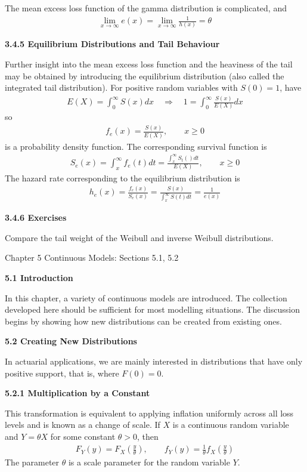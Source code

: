 \documentclass[hidelinks, 12pt]{article}
\theoremstyle{mydefstyle}
\theoremstyle{mythmstyle}
\begin{document}
The mean excess loss function of the gamma distribution is complicated, and
\begin{gather*}
\lim_{x \to \infty} e(x) = \lim_{x \to \infty} \frac{1}{h(x)} = \theta
\end{gather*}

\textbf{3.4.5 Equilibrium Distributions and Tail Behaviour}

Further insight into the mean excess loss function and the heaviness of the tail may be obtained by introducing the equilibrium distribution (also called the integrated tail distribution). For positive random variables with $S(0) = 1$, have
\begin{gather*}
E(X) = \int_0^{\infty} S(x) dx \quad\Rightarrow\quad 1 = \int_0^{\infty} \frac{S(x)}{E(X)} dx
\end{gather*}
so 
\begin{gather*}
f_e(x) = \frac{S(x)}{E(X)}, \qquad x \ge 0
\end{gather*}
is a probability density function. The corresponding survival function is
\begin{gather*}
S_e(x) = \int_x^{\infty} f_e(t) dt = \frac{\int_x^{\infty} S_t() dt}{E(X)}, \qquad x \ge 0
\end{gather*}
The hazard rate corresponding to the equilibrium distribution is
\begin{gather*}
h_e(x) = \frac{f_e(x)}{S_e(x)} = \frac{S(x)}{\int_x^{\infty} S(t) dt} = \frac{1}{e(x)}
\end{gather*}

\textbf{3.4.6 Exercises}

Compare the tail weight of the Weibull and inverse Weibull distributions.

\newpage

Chapter 5 Continuous Models: Sections 5.1, 5.2

\textbf{5.1 Introduction}

In this chapter, a variety of continuous models are introduced. The collection developed here should be sufficient for most modelling situations. The discussion begins by showing how new distributions can be created from existing ones.

\textbf{5.2 Creating New Distributions}

In actuarial applications, we are mainly interested in distributions that have only positive support, that is, where $F(0) = 0$. 

\textbf{5.2.1 Multiplication by a Constant}

This transformation is equivalent to applying inflation uniformly across all loss levels and is known as a change of scale. If $X$ is a continuous random variable and $Y = \theta X$ for some constant $\theta > 0$, then
\begin{gather*}
F_Y(y) = F_X\left(\frac{y}{\theta}\right), \qquad f_Y(y) = \frac{1}{\theta} f_X\left(\frac{y}{\theta}\right)
\end{gather*}
The parameter $\theta$ is a scale parameter for the random variable $Y$. 
\end{document}

